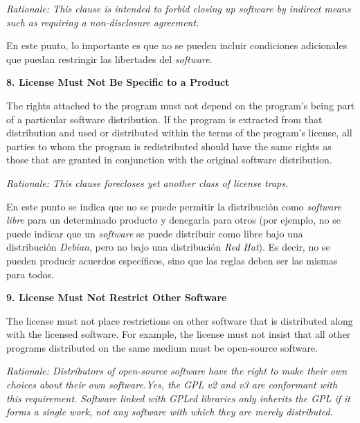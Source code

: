 \textit{Rationale: This clause is intended to forbid closing up software by
indirect means such as requiring a non-disclosure agreement.}\vspace{0.4cm}

En este punto, lo importante es que no se pueden incluir condiciones adicionales
que puedan restringir las libertades del \textit{software}.\vspace{0.4cm}

{\bf 8. License Must Not Be Specific to a Product

The rights attached to the program must not depend on the program's being part
of a particular software distribution. If the program is extracted from that
distribution and used or distributed within the terms of the program's license,
all parties to whom the program is redistributed should have the same rights as
those that are granted in conjunction with the original software distribution.}

\textit{Rationale: This clause forecloses yet another class of license
traps.}\vspace{0.4cm}

En este punto se indica que no se puede permitir la distribución como
\textit{software libre} para un determinado producto y denegarla para otros (por
ejemplo, no se puede indicar que un \textit{software} se puede distribuir como
libre bajo una distribución \textit{Debian}, pero no bajo una distribución
\textit{Red Hat}). Es decir, no se pueden producir acuerdos específicos, sino
que las reglas deben ser las mismas para todos.\vspace{0.4cm}

{\bf 9. License Must Not Restrict Other Software

The license must not place restrictions on other software that is distributed
along with the licensed software. For example, the license must not insist that
all other programs distributed on the same medium must be open-source software.}

\textit{Rationale: Distributors of open-source software have the right to make
their own choices about their own software.\newline Yes, the GPL v2 and v3 are
conformant with this requirement. Software linked with GPLed libraries only
inherits the GPL if it forms a single work, not any software with which they are
merely distributed.}\vspace{0.4cm}

